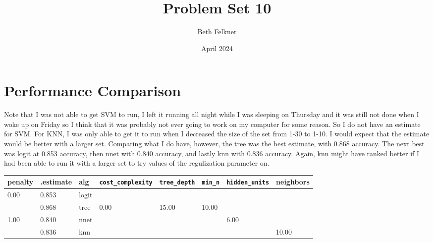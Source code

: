 \documentclass{article}
\title{Problem Set 10}
\author{Beth Felkner}
\date{April 2024}
\begin{document}
\maketitle

\section{Performance Comparison}
Note that I was not able to get SVM to run, I left it running all night while I was sleeping on Thursday and it was still not done when I woke up on Friday so I think that it was probably not ever going to work on my computer for some reason. So I do not have an estimate for SVM. For KNN, I was only able to get it to run when I decreased the size of the set from 1-30 to 1-10. I would expect that the estimate would be better with a larger set. Comparing what I do have, however, the tree was the best estimate, with 0.868 accuracy. The next best was logit at 0.853 accuracy, then nnet with 0.840 accuracy, and lastly knn with 0.836 accuracy. Again, knn might have ranked better if I had been able to run it with a larger set to try values of the regulization parameter on. 

\begin{table}[!htbp]
\centering
\begin{tabular}[t]{llllllll}
\toprule
penalty & .estimate & alg & \verb|cost_complexity| & \verb|tree_depth| & \verb|min_n| & \verb|hidden_units| & neighbors\\
\midrule
0.00 & 0.853 & logit &  &  &  &  & \\
 & 0.868 & tree & 0.00 & 15.00 & 10.00 &  & \\
1.00 & 0.840 & nnet &  &  &  & 6.00 & \\
 & 0.836 & knn &  &  &  &  & 10.00\\
\bottomrule
\end{tabular}
\end{table}
\end{document}
